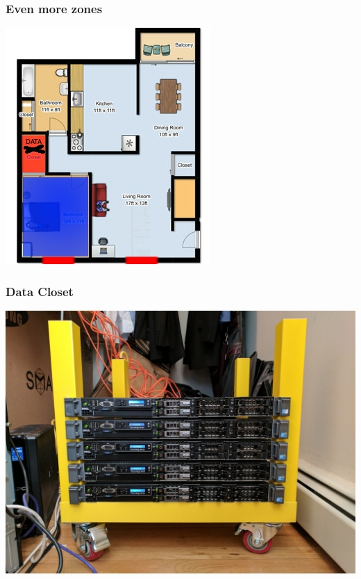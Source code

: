 \documentclass[aspectratio=169,11pt,hyperref={colorlinks=true}]{beamer}
\begin{document}
\begin{frame}
    \frametitle{Even more zones}
    \begin{center}
    \includegraphics[height=.85\textheight]{floorplan-datacloset.png}

    \end{center}
\end{frame}

\begin{frame}
    \frametitle{Data Closet}
    \centering
    \includegraphics[width=.75\textwidth]{data_closet.jpg}
\end{frame}
\end{document}

